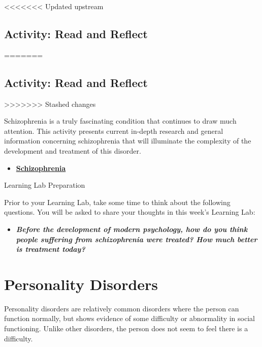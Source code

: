 \documentclass[
]{book}
\providecommand{\tightlist}{%
  \setlength{\itemsep}{0pt}\setlength{\parskip}{0pt}}
\begin{document}
<<<<<<< Updated upstream
\hypertarget{activity-read-and-reflect-17}{%
\subsection*{Activity: Read and Reflect}\label{activity-read-and-reflect-17}}
=======
\hypertarget{activity-read-and-reflect-16}{%
\subsection*{Activity: Read and Reflect}\label{activity-read-and-reflect-16}}
>>>>>>> Stashed changes

\begin{reflect}
Schizophrenia is a truly fascinating condition that continues to draw much attention. This activity presents current in-depth research and general information concerning schizophrenia that will illuminate the complexity of the development and treatment of this disorder.

\begin{itemize}
\tightlist
\item
  \href{http://schizophrenia.com/}{\textbf{Schizophrenia}}
\end{itemize}

{Learning Lab Preparation}

Prior to your Learning Lab, take some time to think about the following questions. You will be asked to share your thoughts in this week's Learning Lab:

\begin{itemize}
\tightlist
\item
  \textbf{\emph{Before the development of modern psychology, how do you think people suffering from schizophrenia were treated? How much better is treatment today?}}
\end{itemize}
\end{reflect}

\hypertarget{personality-disorders}{%
\section{Personality Disorders}\label{personality-disorders}}

Personality disorders are relatively common disorders where the person can function normally, but shows evidence of some difficulty or abnormality in social functioning. Unlike other disorders, the person does not seem to feel there is a difficulty.
\end{document}

